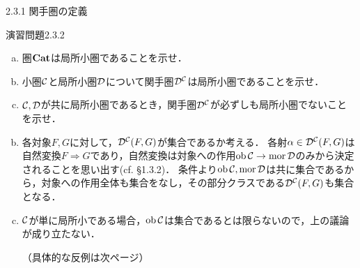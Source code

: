\documentclass[uplatex,a4paper,dvipdfmx,aspectratio=169,10pt]{beamer}
\begin{document}
\begin{frame}[fragile]{2.3.1 関手圏の定義}
    \begin{exampleblock}{演習問題2.3.2}
        \begin{enumerate}[(a)]
            \item 圏$\mathbf{Cat}$は局所小圏であることを示せ．
            \item 小圏$\mathcal{C}$と局所小圏$\mathcal{D}$について関手圏$\mathcal{D}^{\mathcal{C}}$は局所小圏であることを示せ．
            \item $\mathcal{C}, \mathcal{D}$が共に局所小圏であるとき，関手圏$\mathcal{D}^{\mathcal{C}}$が必ずしも局所小圏でないことを示せ．
        \end{enumerate}
    \end{exampleblock}
    \begin{enumerate}[(a)]
        \setcounter{enumi}{1}
        \item 各対象$F, G$に対して，$\mathcal{D}^{\mathcal{C}}(F, G)$が集合であるか考える．
            各射$\alpha \in \mathcal{D}^{\mathcal{C}}(F, G)$は自然変換$F \Rightarrow G$であり，自然変換は対象への作用$\operatorname{{\mathrm{ob}}} \mathcal{C} \to \operatorname{{\mathrm{mor}}} \mathcal{D}$のみから決定されることを思い出す(cf. \S 1.3.2)．
            条件より$\operatorname{{\mathrm{ob}}} \mathcal{C}, \operatorname{{\mathrm{mor}}} \mathcal{D}$は共に集合であるから，対象への作用全体も集合をなし，その部分クラスである$\mathcal{D}^{\mathcal{C}}(F, G)$も集合となる．
        \item $\mathcal{C}$が単に局所小である場合，$\operatorname{{\mathrm{ob}}} \mathcal{C}$は集合であるとは限らないので，上の議論が成り立たない．

            （具体的な反例は次ページ）
    \end{enumerate}
\end{frame}
\end{document}
